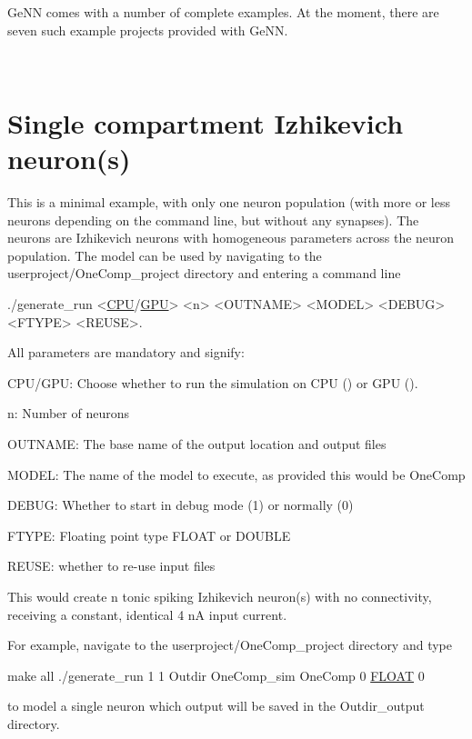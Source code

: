 Ge\+N\+N comes with a number of complete examples. At the moment, there are seven such example projects provided with Ge\+N\+N.

~\newline
\hypertarget{Examples_Ex_OneComp}{}\section{Single compartment Izhikevich neuron(s)}\label{Examples_Ex_OneComp}
This is a minimal example, with only one neuron population (with more or less neurons depending on the command line, but without any synapses). The neurons are Izhikevich neurons \cite{izhikevich2003simple} with homogeneous parameters across the neuron population. The model can be used by navigating to the {\ttfamily userproject/\+One\+Comp\+\_\+project} directory and entering a command line 
\begin{DoxyCode}
./generate\_run <\hyperlink{modelSpec_8h_ad703205f9a4d4bb6af9c25257c23ce6d}{CPU}/\hyperlink{modelSpec_8h_a39cb9803524b6f3b783344b2f89867b4}{GPU}> <n> <OUTNAME> <MODEL> <DEBUG> <FTYPE> <REUSE>.
\end{DoxyCode}
 All parameters are mandatory and signify\+: \begin{DoxyItemize}
\item {\ttfamily C\+P\+U/\+G\+P\+U}\+: Choose whether to run the simulation on C\+P\+U ({}) or G\+P\+U ({}). \item {\ttfamily n}\+: Number of neurons \item {\ttfamily O\+U\+T\+N\+A\+M\+E}\+: The base name of the output location and output files \item {\ttfamily M\+O\+D\+E\+L}\+: The name of the model to execute, as provided this would be {\ttfamily One\+Comp} \item {\ttfamily D\+E\+B\+U\+G}\+: Whether to start in debug mode (1) or normally (0) \item {\ttfamily F\+T\+Y\+P\+E}\+: Floating point type {\ttfamily F\+L\+O\+A\+T} or {\ttfamily D\+O\+U\+B\+L\+E} \item {\ttfamily R\+E\+U\+S\+E}\+: whether to re-\/use input files\end{DoxyItemize}
This would create {\ttfamily n} tonic spiking Izhikevich neuron(s) with no connectivity, receiving a constant, identical 4 n\+A input current.

For example, navigate to the {\ttfamily userproject/\+One\+Comp\+\_\+project} directory and type 
\begin{DoxyCode}
make all
./generate\_run 1 1 Outdir OneComp\_sim OneComp 0 \hyperlink{modelSpec_8h_ae8690abbffa85934d64d545920e2b108}{FLOAT} 0
\end{DoxyCode}
 to model a single neuron which output will be saved in the {\ttfamily Outdir\+\_\+output} directory.

